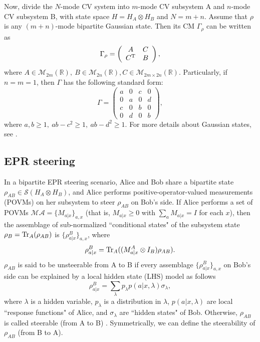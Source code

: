 \documentclass[10pt,aps,pra,amsfonts,amssymb,amsmath,%
floatfix,nofootinbib, groupedaddress,superscriptaddress,citesort,twocolumn
]{revtex4}%
\begin{document}
 Now, divide the $N$-mode CV system into $m$-mode CV subsystem A and $n$-mode CV subsystem B,
with state space $H=H_A\otimes H_B$ and $N=m+n$. Assume that
$\rho$ is any $(m+n)$-mode bipartite Gaussian state. Then its CM $\Gamma_{\rho}$
can be written as
\begin{eqnarray}\label{N2}
	\Gamma_{\rho}=\left(\begin{array}{cc}A& C\\
		C^{\rm T} & B\end{array}\right),
\end{eqnarray}
where $A \in \mathcal M_{2m}({\mathbb R}),\  B
\in \mathcal M_{2n}({\mathbb R}), C\in \mathcal M_{2m\times 2n}({\mathbb R})$.
Particularly, if $n=m=1$, then  $\Gamma$ has the following standard form:
 \begin{equation}\label{standard}
	\Gamma = \left( {\begin{array}{*{20}{c}}
		a&0&c&0\\
		0&a&0&d\\
		c&0&b&0\\
		0&d&0&b
\end{array}} \right),
\end{equation}
where $a, b \ge 1, \ ab - c^2 \ge 1, \ ab - d^2 \ge 1$. For more details about Gaussian states, see \cite{WPG1,S1}.



\subsection{EPR steering}

 In a  	bipartite EPR steering scenario, Alice and Bob share  a bipartite state $\rho_{AB}\in{\mathcal S}(H_A\otimes H_B)$, and Alice performs
positive-operator-valued  measurements (POVMs)	on her subsystem to steer $\rho_{AB}$ on Bob's side.  If Alice performs a set of POVMs  ${\mathcal {MA}} = \{M_{a|x}\}_{a,x}$ (that is, $M_{a|x} \geq0$ with $\sum_a
M_{a|x} = I$ for each $x$), then the assemblage of sub-normalized ``conditional  states" of the
subsystem state $\rho_B={\rm Tr}_A(\rho_{AB})$ is $\{\rho^B_{a|x}\}_{a,x}$, where
$$\rho^B_{a|x}={\rm Tr}_A ((M^A_{a|x}\otimes I_B){\rho}_{AB}).$$
$\rho_{AB}$  is said to be unsteerable from A to B if every assemblage
$\{\rho^B_{a|x}\}_{a,x}$ on Bob's side can be explained by a  local hidden state (LHS) model as follows
$$\rho^B_{a|x}=\sum_\lambda p_\lambda p(a|x,\lambda)\sigma_\lambda,$$
where $\lambda$ is a hidden variable,
$p_\lambda$ is a distribution in $\lambda$,  $p(a|x,\lambda)$ are local
``response functions" of Alice, and  $\sigma_\lambda$
are ``hidden states" of Bob. Otherwise, $\rho_{AB}$ is called steerable (from A
to B) \cite{WJ}. 
Symmetrically,
we can define the steerability of $\rho_{AB}$ (from B to A).
\end{document}

